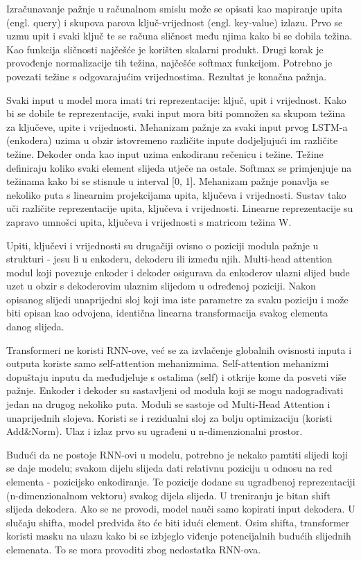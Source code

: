 	Izračunavanje pažnje u računalnom smislu može se opisati kao mapiranje upita (engl. {query}) i skupova parova ključ-vrijednost (engl. {key-value}) izlazu. Prvo se uzmu upit i svaki ključ te se računa sličnost među njima kako bi se dobila težina. Kao funkcija sličnosti najčešće je korišten skalarni produkt. Drugi korak je provođenje normalizacije tih težina, najčešće softmax funkcijom. Potrebno je povezati težine s odgovarajućim vrijednostima. Rezultat je konačna pažnja. 

	Svaki input u model mora imati tri reprezentacije: ključ, upit i vrijednost. Kako bi se dobile te reprezentacije, svaki input mora biti pomnožen sa skupom težina za ključeve, upite i vrijednosti. Mehanizam pažnje za svaki input prvog LSTM-a (enkodera) uzima u obzir istovremeno različite inpute dodjeljujući im različite težine. Dekoder onda kao input uzima enkodiranu rečenicu i težine. Težine definiraju koliko svaki element slijeda utječe na ostale. Softmax se primjenjuje na težinama kako bi se stisnule u interval [0, 1]. 
Mehanizam pažnje ponavlja se nekoliko puta s linearnim projekcijama upita, ključeva i vrijednosti. Sustav tako uči različite reprezentacije upita, ključeva i vrijednosti. Linearne reprezentacije su zapravo umnošci upita, ključeva i vrijednosti s matricom težina W. 

	Upiti, ključevi i vrijednosti su drugačiji ovisno o poziciji modula pažnje u strukturi - jesu li u enkoderu, dekoderu ili između njih. Multi-head attention modul koji povezuje enkoder i dekoder osigurava da enkoderov ulazni slijed bude uzet u obzir s dekoderovim ulaznim slijedom u određenoj poziciji. Nakon opisanog slijedi unaprijedni sloj koji ima iste parametre za svaku poziciju i može biti opisan kao odvojena, identična linearna transformacija svakog elementa danog slijeda.

	Transformeri ne koristi RNN-ove, već se za izvlačenje globalnih ovisnosti inputa i outputa koriste samo self-attention mehanizmima. Self-attention mehanizmi dopuštaju inputu da međudjeluje s ostalima (self) i otkrije kome da posveti više pažnje.
Enkoder i dekoder su sastavljeni od modula koji se mogu nadograđivati jedan na drugog nekoliko puta. Moduli se sastoje od Multi-Head Attention i unaprijednih slojeva. Koristi se i rezidualni sloj za bolju optimizaciju (koristi Add\&Norm). Ulaz i izlaz prvo su ugrađeni u n-dimenzionalni prostor.

	Budući da ne postoje RNN-ovi u modelu, potrebno je nekako pamtiti slijedi koji se daje modelu; svakom dijelu slijeda dati relativnu poziciju u odnosu na red elementa - pozicijsko enkodiranje. Te pozicije dodane su ugradbenoj reprezentaciji (n-dimenzionalnom vektoru) svakog dijela slijeda. U treniranju je bitan shift slijeda dekodera. Ako se ne provodi, model nauči samo kopirati input dekodera. U slučaju shifta, model predviđa što će biti idući element. Osim shifta, transformer koristi masku na ulazu kako bi se izbjeglo viđenje potencijalnih budućih slijednih elemenata. To se mora provoditi zbog nedostatka RNN-ova.

